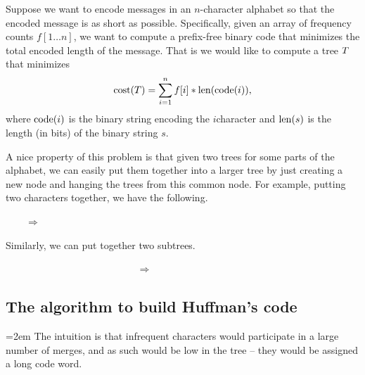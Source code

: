 
Suppose we want to encode messages in an $n$-character alphabet so
that the encoded message is as short as possible. Specifically, given
an array of frequency counts $f[1 \ldots n]$, we want to compute a
prefix-free binary code that minimizes the total encoded length of the
message. That is we would like to compute a tree $T$ that
minimizes
\begin{align}
    \costX{\Tree} = 
    \sum_{i=1}^n f[i] * \lengthX{ \codeX{i}}, %
    \eqlab{compressor}
\end{align}
where $\codeX{i}$ is the binary string encoding the $i$\th character
and $\lengthX{s}$ is the length (in bits) of the binary string $s$.


A nice property of this problem is that given two trees for some parts
of the alphabet, we can easily put them together into a larger tree by
just creating a new node and hanging the trees from this common
node. For example, putting two characters together, we have the following.
\begin{center}
      
    ~~~~$\Rightarrow$~~~~
\end{center}
Similarly, we can put together two subtrees.
\begin{center}
    ~~~~~~~~~~~~~~~~~~~~~~
    \TreePKGtriangle[A]{1cm}{1cm}    
    \TreePKGtriangle[B]{1cm}{1cm}    
    ~~~~$\Rightarrow$~~~~
    \tree{\TreePKGtriangle[A]{1cm}{1cm}    }{
    \TreePKGtriangle[B]{1cm}{1cm}    }
\end{center}

\subsection{The algorithm to build Huffman's code}

\begingroup\emergencystretch=2em
 The intuition
is that infrequent characters would participate in a large number of
merges, and as such would be low in the tree -- they would be assigned
a long code word.
\endgroup

